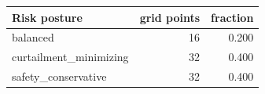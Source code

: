 \begin{tabular}{lrr}
\toprule
Risk posture & grid points & fraction \\
\midrule
balanced & 16 & 0.200 \\
curtailment\_minimizing & 32 & 0.400 \\
safety\_conservative & 32 & 0.400 \\
\bottomrule
\end{tabular}

